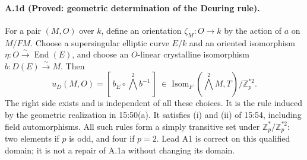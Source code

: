 \paragraph{A.1d (Proved: geometric determination of the Deuring rule).}
For a pair $(M,O)$ over $k$, define an orientation
$\zeta_M:O\to k$ by the action of $a$ on $M/FM$. Choose a supersingular elliptic curve $E/k$ and
an oriented isomorphism $\eta:O\xrightarrow{\sim}\operatorname{End}(E)$,
and choose an $O$-linear crystalline isomorphism
$b:D(E)\xrightarrow{\sim}M$. Then
\begin{equation}\label{eq:A-Deuring}
 \boxed{\quad u_D(M,O)=
 [\,b_E\circ\bigwedge^2 b^{-1}\,]
 \ \in\operatorname{Isom}_{F}(\bigwedge^2M,T)/\mathbb Z_p^{*2}.
 \quad}
\end{equation}
The right side exists and is independent of all these choices. It is
the rule induced by the geometric realization in 15:50(a). It satisfies
(i) and (ii) of 15:54, including field automorphisms. All such rules form
a simply transitive set under $\mathbb Z_p^*/\mathbb Z_p^{*2}$: two
elements if $p$ is odd, and four if $p=2$. Lead A1 is correct on this
qualified domain; it is not a repair of A.1a without changing its domain.


